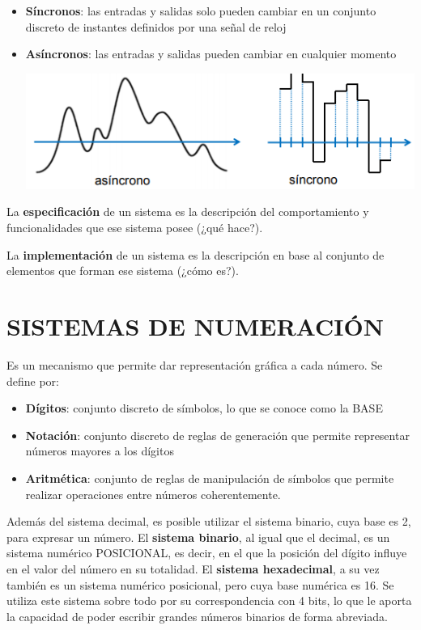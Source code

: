 \documentclass[a4paper,10pt]{book}
\begin{document}
\begin{itemize}
\item \textbf{Síncronos}: las entradas y salidas solo pueden cambiar en un conjunto discreto de instantes definidos por una señal de reloj
\item \textbf{Asíncronos}: las entradas y salidas pueden cambiar en cualquier momento

\begin{center}
\includegraphics[scale=0.65]{sincrono y asincrono}
\end{center}

\end{itemize}

La \textbf{especificación} de un sistema es la descripción del comportamiento y funcionalidades que ese sistema posee (¿qué hace?).\par
La \textbf{implementación} de un sistema es la descripción en base al conjunto de elementos que forman ese sistema (¿cómo es?).

\section*{SISTEMAS DE NUMERACIÓN} 
Es un mecanismo que permite dar representación gráfica a cada número. Se define por:

\begin{itemize}
\item \textbf{Dígitos}: conjunto discreto de símbolos, lo que se conoce como la BASE
\item \textbf{Notación}: conjunto discreto de reglas de generación que permite representar números mayores a los dígitos
\item \textbf{Aritmética}: conjunto de reglas de manipulación de símbolos que permite realizar operaciones entre números coherentemente.
\end{itemize}

Además del sistema decimal, es posible utilizar el sistema binario, cuya base es 2, para expresar un número. El \textbf{sistema binario}, al igual que el decimal, es un sistema numérico POSICIONAL, es decir, en el que la posición del dígito influye en el valor del número en su totalidad.
El \textbf{sistema hexadecimal}, a su vez también es un sistema numérico posicional, pero cuya base numérica es 16. Se utiliza este sistema sobre todo por su correspondencia con 4 bits, lo que le aporta la capacidad de poder escribir grandes números binarios de forma abreviada.
\end{document}
